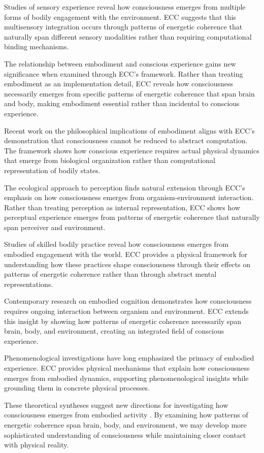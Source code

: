 Studies of sensory experience \cite{Howes2003} reveal how consciousness emerges from multiple forms of bodily engagement with the environment. ECC suggests that this multisensory integration occurs through patterns of energetic coherence that naturally span different sensory modalities rather than requiring computational binding mechanisms.

The relationship between embodiment and conscious experience \cite{Jackson1989} gains new significance when examined through ECC's framework. Rather than treating embodiment as an implementation detail, ECC reveals how consciousness necessarily emerges from specific patterns of energetic coherence that span brain and body, making embodiment essential rather than incidental to conscious experience.

Recent work on the philosophical implications of embodiment \cite{Lakoff1999} aligns with ECC's demonstration that consciousness cannot be reduced to abstract computation. The framework shows how conscious experience requires actual physical dynamics that emerge from biological organization rather than computational representation of bodily states.

The ecological approach to perception \cite{Gibson1979} finds natural extension through ECC's emphasis on how consciousness emerges from organism-environment interaction. Rather than treating perception as internal representation, ECC shows how perceptual experience emerges from patterns of energetic coherence that naturally span perceiver and environment.

Studies of skilled bodily practice \cite{Ingold2000} reveal how consciousness emerges from embodied engagement with the world. ECC provides a physical framework for understanding how these practices shape consciousness through their effects on patterns of energetic coherence rather than through abstract mental representations.

Contemporary research on embodied cognition \cite{Clark1997} demonstrates how consciousness requires ongoing interaction between organism and environment. ECC extends this insight by showing how patterns of energetic coherence necessarily span brain, body, and environment, creating an integrated field of conscious experience.

Phenomenological investigations \cite{MerleauPonty1962} have long emphasized the primacy of embodied experience. ECC provides physical mechanisms that explain how consciousness emerges from embodied dynamics, supporting phenomenological insights while grounding them in concrete physical processes.

These theoretical syntheses suggest new directions for investigating how consciousness emerges from embodied activity \cite{Varela1991}. By examining how patterns of energetic coherence span brain, body, and environment, we may develop more sophisticated understanding of consciousness while maintaining closer contact with physical reality.
